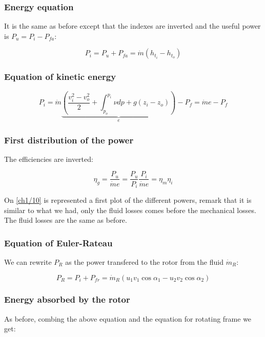 \subsubsection{Energy equation}
It is the same as before except that the indexes are inverted and the useful power is $P_u = P_i - P_{fa}$:

\begin{equation}
P_i = P_u + P_{fa} = \dot{m} (h_{t_i} - h_{t_o})
\end{equation} 

\subsubsection{Equation of kinetic energy}
\begin{equation}
P_i = \dot{m} \underbrace{\left( \frac{v_i^2-v_o^2}{2} + \int _{p_o}^{p_i} \nu dp + g(z_i - z_o)\right)}_{e} - P_f = \dot{m} e - P_f
\end{equation}

\subsubsection{First distribution of the power}
The efficiencies are inverted: 

\begin{equation}
\eta _g = \frac{P_u}{\dot{m}e} = \frac{P_u}{P_i}\frac{P_i}{\dot{m}e} = \eta _m \eta _i
\end{equation}

On \autoref{ch1/10} is represented a first plot of the different powers, remark that it is similar to what we had, only the fluid losses comes before the mechanical losses. The fluid losses are the same as before. 


\subsubsection{Equation of Euler-Rateau}
We can rewrite $P_R$ as the power transfered to the rotor from the fluid $\dot{m}_R$: 

\begin{equation}
P_R = P_i + P_{fr} = \dot{m} _R (u_1v_1\cos \alpha _1 - u_2v_2\cos \alpha _2) 
\end{equation}

\subsubsection{Energy absorbed by the rotor}
As before, combing the above equation and the equation for rotating frame we get: 

